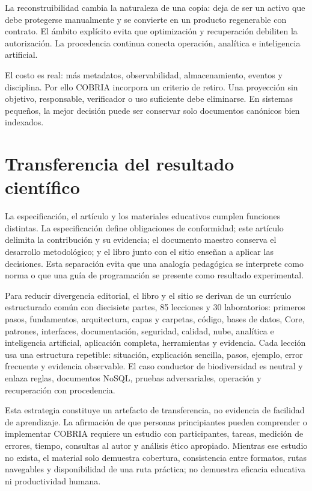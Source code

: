\documentclass[12pt]{article}
\begin{document}
La reconstruibilidad cambia la naturaleza de una copia: deja de ser un activo que debe
protegerse manualmente y se convierte en un producto regenerable con contrato. El ámbito
explícito evita que optimización y recuperación debiliten la autorización. La
procedencia continua conecta operación, analítica e inteligencia artificial.

El costo es real: más metadatos, observabilidad, almacenamiento, eventos y disciplina.
Por ello COBRIA incorpora un criterio de retiro. Una proyección sin objetivo,
responsable, verificador o uso suficiente debe eliminarse. En sistemas pequeños, la
mejor decisión puede ser conservar solo documentos canónicos bien indexados.

\section{Transferencia del resultado científico}

La especificación, el artículo y los materiales educativos cumplen funciones distintas.
La especificación define obligaciones de conformidad; este artículo delimita la
contribución y su evidencia; el documento maestro conserva el desarrollo metodológico;
y el libro junto con el sitio enseñan a aplicar las decisiones. Esta separación evita
que una analogía pedagógica se interprete como norma o que una guía de programación se
presente como resultado experimental.

Para reducir divergencia editorial, el libro y el sitio se derivan de un currículo
estructurado común con diecisiete partes, 85 lecciones y 30 laboratorios: primeros pasos,
fundamentos, arquitectura, capas y carpetas, código,
bases de datos, Core, patrones, interfaces, documentación, seguridad, calidad, nube,
analítica e inteligencia artificial, aplicación completa, herramientas y evidencia.
Cada lección usa una estructura repetible: situación, explicación sencilla, pasos,
ejemplo, error frecuente y evidencia observable. El caso conductor de biodiversidad es
neutral y enlaza reglas, documentos NoSQL, pruebas adversariales, operación y
recuperación con procedencia.

Esta estrategia constituye un artefacto de transferencia, no evidencia de facilidad de
aprendizaje. La afirmación de que personas principiantes pueden comprender o implementar
COBRIA requiere un estudio con participantes, tareas, medición de errores, tiempo,
consultas al autor y análisis ético apropiado. Mientras ese estudio no exista, el
material solo demuestra cobertura, consistencia entre formatos, rutas navegables y
disponibilidad de una ruta práctica; no demuestra eficacia educativa ni productividad
humana.
\end{document}
